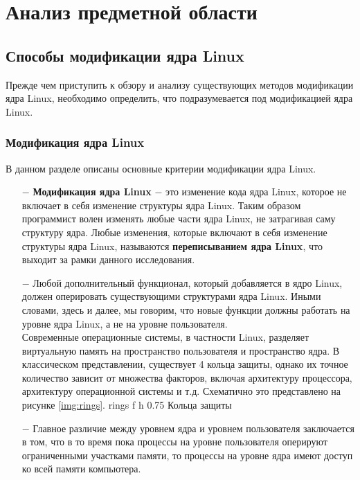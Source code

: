 \chapter{Анализ предметной области}\label{ch:--anal}

\section{Способы модификации ядра Linux}\label{sec:--anal--methods}

Прежде чем приступить к обзору и анализу существующих методов модификации ядра Linux, необходимо определить, что подразумевается под модификацией ядра Linux.

\subsection{Модификация ядра Linux}\label{subsec:--anal--methods--mod}

В данном разделе описаны основные критерии модификации ядра Linux.

\begin{itemize}
    \item[$-$] \textbf{Модификация ядра Linux} $-$ это изменение кода ядра Linux, которое не включает в себя изменение структуры ядра Linux.
    Таким образом программист волен изменять любые части ядра Linux, не затрагивая саму структуру ядра.
    Любые изменения, которые включают в себя изменение структуры ядра Linux, называются \textbf{переписыванием ядра Linux}, что выходит за рамки данного исследования.
    \item[$-$] Любой дополнительный функционал, который добавляется в ядро Linux, должен оперировать существующими структурами ядра Linux.
    Иными словами, здесь и далее, мы говорим, что новые функции должны работать на уровне ядра Linux, а не на уровне пользователя.
    \\[0.5em]
    Современные операционные системы, в частности Linux, разделяет виртуальную память на пространство пользователя и пространство ядра.
    В классическом представлении, существует 4 кольца защиты, однако их точное количество зависит от множества факторов, включая архитектуру процессора, архитектуру операционной системы и т.д. Схематично это представлено на рисунке \ref{img:rings}.
    {rings} %
    {f}
    {h}
    {0.75\textwidth} %
    {Кольца защиты} %
    \newpage
    \item[$-$] Главное различие между уровнем ядра и уровнем пользователя заключается в том, что в то время пока процессы на уровне пользователя оперируют ограниченными участками памяти,
    то процессы на уровне ядра имеют доступ ко всей памяти компьютера.
\end{itemize}

